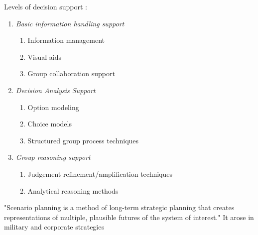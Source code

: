 Levels of decision support \cite{jankowskiGISGroupDecision2001}:

\begin{enumerate}[itemsep=0pt,parsep=0pt]
	\item{\textit{Basic information handling support}}
		\begin{enumerate}[itemsep=0pt,parsep=0pt,topsep=0pt, partopsep=0pt]
			\item{Information management}
			\item{Visual aids}
			\item{Group collaboration support}
		\end{enumerate}
	\item{\textit{Decision Analysis Support}}
		\begin{enumerate}[itemsep=0pt,parsep=0pt,topsep=0pt, partopsep=0pt]
			\item{Option modeling}
			\item{Choice models}
			\item{Structured group process techniques}
		\end{enumerate}
	\item{\textit{Group reasoning support}}
		\begin{enumerate}[itemsep=0pt,parsep=0pt,topsep=0pt, partopsep=0pt]
			\item{Judgement refinement/amplification techniques}
			\item{Analytical reasoning methods}
		\end{enumerate}
\end{enumerate}


"Scenario planning is a method of long-term strategic planning that creates representations of multiple, plausible futures of the system of interest." It arose in military and corporate strategies \cite{goodspeedScenarioPlanningCities2020} 

